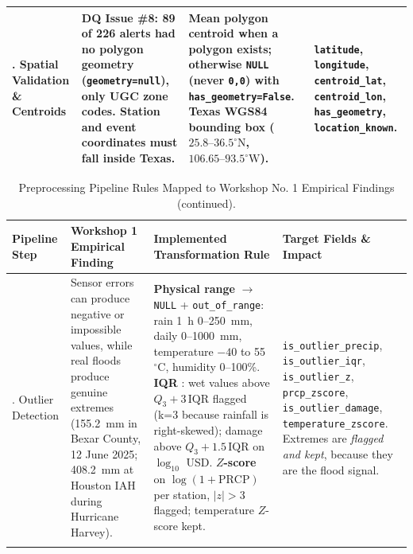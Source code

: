 \documentclass[stu, 12pt, letterpaper, donotrepeattitle, floatsintext, natbib]{apa7}
\begin{document}
\begin{table}[H]
\begin{tabularx}{\textwidth}{>{\raggedright\arraybackslash}p{2.2cm} >{\raggedright\arraybackslash}p{3.6cm} >{\raggedright\arraybackslash}p{4.6cm} >{\raggedright\arraybackslash}X}
\addlinespace
4. Spatial Validation \& Centroids & DQ Issue \#8: 89 of 226 alerts had no polygon geometry (\texttt{geometry=null}), only UGC zone codes. Station and event coordinates must fall inside Texas. & Mean polygon centroid when a polygon exists; otherwise \texttt{NULL} (never \texttt{0,0}) with \texttt{has\_geometry=False}. Texas WGS84 bounding box ($25.8\text{--}36.5^\circ\text{N}$, $106.65\text{--}93.5^\circ\text{W}$). & \texttt{latitude}, \texttt{longitude}, \texttt{centroid\_lat}, \texttt{centroid\_lon}, \texttt{has\_geometry}, \texttt{location\_known}. \\
\bottomrule
\end{tabularx}
\end{table}

\begin{table}[H]
\centering
\scriptsize
\caption{Preprocessing Pipeline Rules Mapped to Workshop No. 1 Empirical Findings (continued).}
\label{tab:preprocessing_rules_2}
\begin{tabularx}{\textwidth}{>{\raggedright\arraybackslash}p{2.2cm} >{\raggedright\arraybackslash}p{3.6cm} >{\raggedright\arraybackslash}p{4.6cm} >{\raggedright\arraybackslash}X}
\toprule
\textbf{Pipeline Step} & \textbf{Workshop 1 Empirical Finding} & \textbf{Implemented Transformation Rule} & \textbf{Target Fields \& Impact} \\
\midrule
5. Outlier Detection & Sensor errors can produce negative or impossible values, while real floods produce genuine extremes (155.2~mm in Bexar County, 12 June 2025; 408.2~mm at Houston IAH during Hurricane Harvey). & \textbf{Physical range} $\rightarrow$ \texttt{NULL} + \texttt{out\_of\_range}: rain 1~h 0--250~mm, daily 0--1000~mm, temperature $-40$ to 55~$^\circ$C, humidity 0--100\%. \textbf{IQR} \citep{tukey1977}: wet values above $Q_3 + 3\,\mathrm{IQR}$ flagged (k=3 because rainfall is right-skewed); damage above $Q_3 + 1.5\,\mathrm{IQR}$ on $\log_{10}$ USD. \textbf{$Z$-score} on $\log(1+\text{PRCP})$ per station, $|z|>3$ flagged; temperature $Z$-score kept. & \texttt{is\_outlier\_precip}, \texttt{is\_outlier\_iqr}, \texttt{is\_outlier\_z}, \texttt{prcp\_zscore}, \texttt{is\_outlier\_damage}, \texttt{temperature\_zscore}. Extremes are \emph{flagged and kept}, because they are the flood signal. \\
\addlinespace

\end{tabularx}
\end{table}
\end{document}
